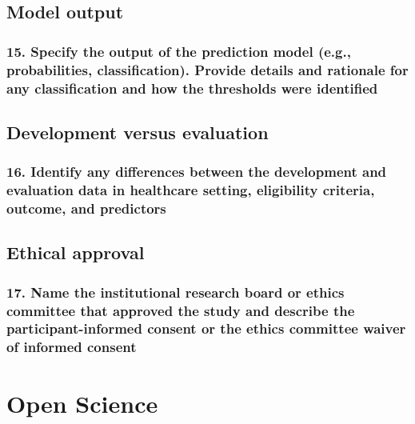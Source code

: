 \documentclass[
  letterpaper,
  DIV=11,
  numbers=noendperiod]{scrartcl}
\begin{document}
\subsection{Model output}\label{model-output}

\subsubsection{15. Specify the output of the prediction model (e.g.,
probabilities, classification). Provide details and rationale for any
classification and how the thresholds were
identified}\label{specify-the-output-of-the-prediction-model-e.g.-probabilities-classification.-provide-details-and-rationale-for-any-classification-and-how-the-thresholds-were-identified}

\subsection{Development versus
evaluation}\label{development-versus-evaluation}

\subsubsection{16. Identify any differences between the development and
evaluation data in healthcare setting, eligibility criteria, outcome,
and
predictors}\label{identify-any-differences-between-the-development-and-evaluation-data-in-healthcare-setting-eligibility-criteria-outcome-and-predictors}

\subsection{Ethical approval}\label{ethical-approval}

\subsubsection{17. Name the institutional research board or ethics
committee that approved the study and describe the participant-informed
consent or the ethics committee waiver of informed
consent}\label{name-the-institutional-research-board-or-ethics-committee-that-approved-the-study-and-describe-the-participant-informed-consent-or-the-ethics-committee-waiver-of-informed-consent}

\section{Open Science}\label{open-science}
\end{document}
